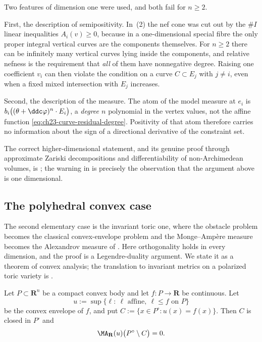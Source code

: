 \begin{remark}
\label{rem:ch23-model-slackness-fails}
Two features of dimension one were used, and both fail for $n\geq2$.

First, the description of semipositivity.  In
\,(2) the nef cone was cut out by the
$\#I$ linear inequalities $A_i(v)\geq0$, because in a one-dimensional
special fibre the only proper integral vertical curves are the components
themselves.  For $n\geq2$ there can be infinitely many
vertical curves lying inside the components, and relative nefness is the
requirement that \emph{all} of them have nonnegative degree.  Raising one
coefficient $v_i$ can then violate the condition on a curve
$C\subset E_j$ with $j\ne i$, even when a fixed mixed intersection with $E_j$ increases.

Second, the description of the measure.  The atom of the model measure at
$e_i$ is $b_i\bigl((\theta+\ddc\varphi)^n\cdot E_i\bigr)$, a
\emph{degree $n$} polynomial in the vertex values, not the affine function
\eqref{eq:ch23-curve-residual-degree}.  Positivity of that atom therefore
carries no information about the sign of a directional derivative of the
constraint set.

The correct higher-dimensional statement, and its genuine proof through
approximate Zariski decompositions and differentiability of non-Archimedean
volumes, is ; the warning in
 is precisely the observation that the
argument above is one dimensional.
\end{remark}

\subsection{The polyhedral convex case}
\label{sec:ch23-convex-orthogonality}

The second elementary case is the invariant toric one, where the obstacle
problem becomes the classical convex-envelope problem and the
Monge--Amp\`ere measure becomes the Alexandrov measure of
.  Here orthogonality holds in every dimension, and
the proof is a Legendre-duality argument.  We state it as a theorem of
convex analysis; the translation to invariant metrics on a polarized toric
variety is .

\begin{theorem}
\label{thm:ch23-convex-envelope-orthogonality}
Let $P\subset\mathbf R^n$ be a compact convex body and let
$f:P\to\mathbf R$ be continuous.  Let
\[
 u:=\sup\{\ell:\ \ell\text{ affine},\ \ell\leq f\text{ on }P\}
\]
be the convex envelope of $f$, and put
$C:=\{x\in P^\circ:u(x)=f(x)\}$.  Then $C$ is closed in $P^\circ$ and
\begin{equation}\label{eq:ch23-convex-orthogonality}
 \MA_{\mathbf R}(u)\bigl(P^\circ\setminus C\bigr)=0 .
\end{equation}
\end{theorem}

